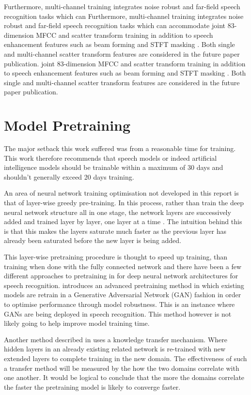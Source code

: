 Furthermore, multi-channel training integrates noise robust and far-field speech recognition tasks which can Furthermore, multi-channel training integrates noise robust and far-field speech recognition tasks which can accommodate joint 83-dimension MFCC and scatter transform training in addition to speech enhancement features such as beam forming and STFT masking \cite{ochiai2017multichannel}. Both single and multi-channel scatter transform features are considered in the future paper publication. joint 83-dimension MFCC and scatter transform training in addition to speech enhancement features such as beam forming and STFT masking \cite{ochiai2017multichannel}. Both single and multi-channel scatter transform features are considered in the future paper publication.

\section{Model Pretraining}
The major setback this work suffered was from a reasonable time for training.  This work therefore recommends that speech models or indeed artificial intelligence models should be trainable within a maximum of 30 days and shouldn't generally exceed 20 days training.

An area of neural network training optimisation not developed in this report is that of layer-wise greedy pre-training.  In this process, rather than train the deep neural network structure all in one stage, the network layers are successively added and trained layer by layer, one layer at a time \citep{Goodfellow-et-al-2016}.  The intuition behind this is that this makes the layers saturate much faster as the previous layer has already been saturated before the new layer is being added.

This layer-wise pretraining procedure is thought to speed up training, than training when done with the fully connected network and there have been a few different approaches to pretraining in for deep neural network architectures for speech recognition. 
\cite{hendrycks2019using} introduces an advanced pretraining method in which existing models are retrain in a Generative Adversarial Network (GAN) fashion in order to optimise performance through model robustness.  This is an instance where GANs are being deployed in speech recognition.  This method however is not likely going to help improve model training time.

Another method described in \citep{ramachandran2016unsupervised,} uses a knowledge transfer mechanism. Where hidden layers in an already existing related network is re-trained with new extended layers to complete training in the new domain.  The effectiveness of such a transfer method will be measured by the how the two domains correlate with one another. It would be logical to conclude that the more the domains correlate the faster the pretraining model is likely to converge faster.

